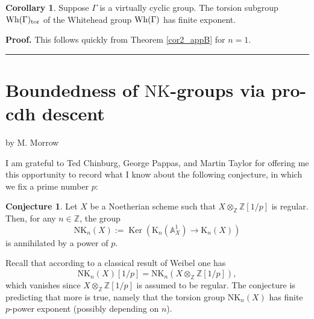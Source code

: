 \documentclass[reqno,11pt,letterpaper]{amsart}
\theoremstyle{plain}
\numberwithin{equation}{subsection}
\newtheorem{corollary}[equation]{Corollary}
\theoremstyle{remark}
\theoremstyle{plain}
\theoremstyle{definition}\newtheorem*{notation}{Notation}
\newcommand{\bbA}{{\mathbb A}}
\newcommand{\bbZ}{{\mathbb Z}}
\newcommand{\op}{\operatorname}
\newtheorem{corollary}[theorem]{Corollary}
\newenvironment{proof}[1][Proof]{\noindent\textbf{#1.} }{\ \rule{0.5em}{0.5em}}
\newcommand{\RK}{\mathrm{K}}
\newcommand{\NK}{\mathrm{NK}}
\newcommand{\BZ}{\mathbb{Z}}
\begin{document}
\begin{corollary}\label{cor3_appB} Suppose $\Gamma$ is a virtually cyclic group.
The torsion subgroup ${\rm Wh}(\Gamma)_{\rm tor}$ of the Whitehead group ${\rm Wh}(\Gamma)$
has finite   exponent.
\end{corollary}

 

\begin{proof} This follows quickly from Theorem \ref{cor2_appB} for $n=1$. 
 \end{proof}

 

 
 



\bigskip
 
\appendix
 
 \section{Boundedness of $\NK$-groups via pro-cdh descent}\label{s:Appendix}
 
 
 
 \centerline{\sc by M. Morrow}
 
\newtheorem{theoremA}[equation]{Theorem}
\newtheorem{propositionA}[equation]{Proposition}
\newtheorem{lemmaA}[equation]{Lemma}
\newtheorem{conjectureA}[equation]{Conjecture}
\newtheorem{remark}[equation]{Remark}
 
 

\bigskip

 
I am grateful to Ted Chinburg, George Pappas, and Martin Taylor for offering me this opportunity to record what I know about the following conjecture, in which we fix a prime number $p$:

\begin{conjectureA}\label{conjecture_app}
Let $X$ be a Noetherian scheme such that $X\otimes_{\bbZ}{\bbZ}[1/p]$ is regular. Then, for any $n\in\bbZ$, the group \[\NK_n(X):=\op{Ker}(\RK_n(\bbA_X^1)\to \RK_n(X))\] is annihilated by a power of $p$.
\end{conjectureA}

Recall that according to a classical result of Weibel \cite[Corol.~6.4]{WMV} one has \[\NK_n(X)[1/p]=\NK_n(X\otimes_\BZ\BZ[1/p]),\] which vanishes since $X\otimes_\BZ\BZ[1/p]$ is assumed to be regular. The conjecture is predicting that more is true, namely that the torsion group $\NK_n(X)$ has finite $p$-power exponent (possibly depending on $n$).
\end{document}

